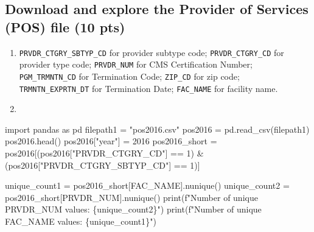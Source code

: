 \documentclass[
  letterpaper,
  DIV=11,
  numbers=noendperiod]{scrartcl}
\newenvironment{Shaded}{\begin{snugshade}}{\end{snugshade}}
\newcommand{\BuiltInTok}[1]{\textcolor[rgb]{0.00,0.23,0.31}{#1}}
\newcommand{\DecValTok}[1]{\textcolor[rgb]{0.68,0.00,0.00}{#1}}
\newcommand{\ImportTok}[1]{\textcolor[rgb]{0.00,0.46,0.62}{#1}}
\newcommand{\NormalTok}[1]{\textcolor[rgb]{0.00,0.23,0.31}{#1}}
\newcommand{\OperatorTok}[1]{\textcolor[rgb]{0.37,0.37,0.37}{#1}}
\newcommand{\SpecialCharTok}[1]{\textcolor[rgb]{0.37,0.37,0.37}{#1}}
\newcommand{\SpecialStringTok}[1]{\textcolor[rgb]{0.13,0.47,0.30}{#1}}
\newcommand{\StringTok}[1]{\textcolor[rgb]{0.13,0.47,0.30}{#1}}
\begin{document}
\subsection{Download and explore the Provider of Services (POS) file (10
pts)}\label{download-and-explore-the-provider-of-services-pos-file-10-pts}

\begin{enumerate}
\def\labelenumi{\arabic{enumi}.}
\item
  \texttt{PRVDR\_CTGRY\_SBTYP\_CD} for provider subtype code;
  \texttt{PRVDR\_CTGRY\_CD} for provider type code; \texttt{PRVDR\_NUM}
  for CMS Certification Number; \texttt{PGM\_TRMNTN\_CD} for Termination
  Code; \texttt{ZIP\_CD} for zip code; \texttt{TRMNTN\_EXPRTN\_DT} for
  Termination Date; \texttt{FAC\_NAME} for facility name.
\item
\end{enumerate}

\begin{Shaded}
\begin{Highlighting}[]
\ImportTok{import}\NormalTok{ pandas }\ImportTok{as}\NormalTok{ pd}
\NormalTok{filepath1 }\OperatorTok{=} \StringTok{"pos2016.csv"}
\NormalTok{pos2016 }\OperatorTok{=}\NormalTok{ pd.read\_csv(filepath1)}
\NormalTok{pos2016.head()}
\NormalTok{pos2016[}\StringTok{"year"}\NormalTok{] }\OperatorTok{=} \DecValTok{2016}
\NormalTok{pos2016\_short }\OperatorTok{=}\NormalTok{ pos2016[(pos2016[}\StringTok{"PRVDR\_CTGRY\_CD"}\NormalTok{] }\OperatorTok{==} \DecValTok{1}\NormalTok{) }\OperatorTok{\&}\NormalTok{ (pos2016[}\StringTok{"PRVDR\_CTGRY\_SBTYP\_CD"}\NormalTok{] }\OperatorTok{==} \DecValTok{1}\NormalTok{)]}
\end{Highlighting}
\end{Shaded}

\begin{Shaded}
\begin{Highlighting}[]
\NormalTok{unique\_count1 }\OperatorTok{=}\NormalTok{ pos2016\_short[}\StringTok{\textquotesingle{}FAC\_NAME\textquotesingle{}}\NormalTok{].nunique()}
\NormalTok{unique\_count2 }\OperatorTok{=}\NormalTok{ pos2016\_short[}\StringTok{\textquotesingle{}PRVDR\_NUM\textquotesingle{}}\NormalTok{].nunique()}
\BuiltInTok{print}\NormalTok{(}\SpecialStringTok{f"Number of unique PRVDR\_NUM values: }\SpecialCharTok{\{}\NormalTok{unique\_count2}\SpecialCharTok{\}}\SpecialStringTok{"}\NormalTok{)}
\BuiltInTok{print}\NormalTok{(}\SpecialStringTok{f"Number of unique FAC\_NAME values: }\SpecialCharTok{\{}\NormalTok{unique\_count1}\SpecialCharTok{\}}\SpecialStringTok{"}\NormalTok{)}
\end{Highlighting}
\end{Shaded}
\end{document}
